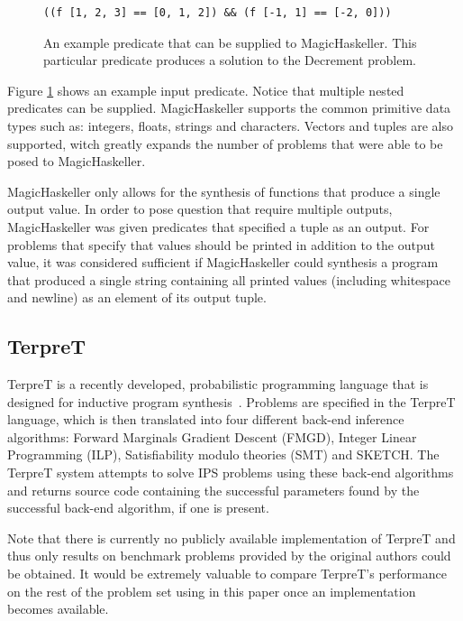 \begin{figure}
\begin{verbatim}
((f [1, 2, 3] == [0, 1, 2]) && (f [-1, 1] == [-2, 0]))  
\end{verbatim}
\caption{An example predicate that can be supplied to MagicHaskeller. This particular predicate produces a solution to the Decrement problem.}
\label{fig:MHpred}
\end{figure}

Figure \ref{fig:MHpred} shows an example input predicate. Notice that multiple nested predicates can be supplied. MagicHaskeller supports the common primitive data types such as: integers, floats, strings and characters. Vectors and tuples are also supported, witch greatly expands the number of problems that were able to be posed to MagicHaskeller.

MagicHaskeller only allows for the synthesis of functions that produce a single output value. In order to pose question that require multiple outputs, MagicHaskeller was given predicates that specified a tuple as an output. For problems that specify that values should be printed in addition to the output value, it was considered sufficient if MagicHaskeller could synthesis a program that produced a single string containing all printed values (including whitespace and newline) as an element of its output tuple.

\subsection{TerpreT}

TerpreT is a recently developed, probabilistic programming language that is designed for inductive program synthesis~\cite{Gaunt2016}. Problems are specified in the TerpreT language, which is then translated into four different back-end inference algorithms: Forward Marginals Gradient Descent (FMGD), Integer Linear Programming (ILP), Satisfiability modulo theories (SMT) and SKETCH.
The TerpreT system attempts to solve IPS problems using these back-end algorithms and returns source code containing the successful parameters found by the successful back-end algorithm, if one is present.

Note that there is currently no publicly available implementation of TerpreT and thus only results on benchmark problems provided by the original authors could be obtained. It would be extremely valuable to compare TerpreT's performance on the rest of the problem set using in this paper once an implementation becomes available.

